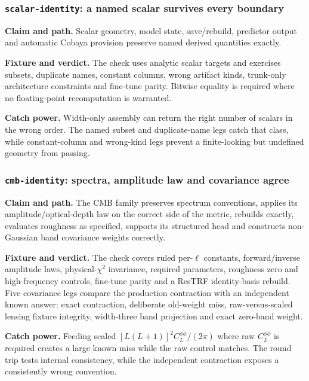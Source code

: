 \documentclass[10pt,aps,prd,twocolumn,nofootinbib]{revtex4-2}
\newcommand{\code}[1]{\texttt{#1}}
\begin{document}
\subsubsection{\code{scalar-identity}: a named scalar survives every boundary}

\textbf{Claim and path.}  Scalar geometry, model state, save/rebuild, predictor
output and automatic Cobaya provision preserve named derived quantities
exactly.

\textbf{Fixture and verdict.}  The check uses analytic scalar targets and
exercises subsets, duplicate names, constant columns, wrong artifact kinds,
trunk-only architecture constraints and fine-tune parity.  Bitwise equality
is required where no floating-point recomputation is warranted.

\textbf{Catch power.}  Width-only assembly can return the right number of
scalars in the wrong order.  The named subset and duplicate-name legs catch
that class, while constant-column and wrong-kind legs prevent a finite-looking
but undefined geometry from passing.

\subsubsection{\code{cmb-identity}: spectra, amplitude law and covariance agree}

\textbf{Claim and path.}  The CMB family preserves spectrum conventions,
applies its amplitude/optical-depth law on the correct side of the metric,
rebuilds exactly, evaluates roughness as specified, supports its structured
head and constructs non-Gaussian band covariance weights correctly.

\textbf{Fixture and verdict.}  The check covers ruled per-\(\ell\) constants,
forward/inverse amplitude laws, physical-\(\chi^2\) invariance, required
parameters, roughness zero and high-frequency controls, fine-tune parity and
a ResTRF identity-basis rebuild.  Five covariance legs compare the production
contraction with an independent known answer: exact contraction, deliberate
old-weight miss, raw-versus-scaled lensing fixture integrity, width-three band
projection and exact zero-band weight.

\textbf{Catch power.}  Feeding scaled
\([L(L+1)]^2C_L^{\phi\phi}/(2\pi)\) where raw
\(C_L^{\phi\phi}\) is required creates a large known miss while the raw
control matches.  The round trip tests internal consistency, while the
independent contraction exposes a consistently wrong convention.
\end{document}
